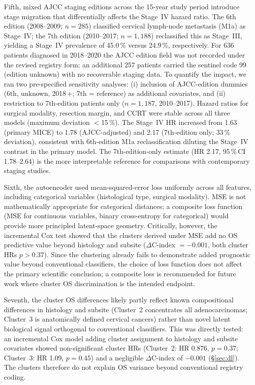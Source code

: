 \documentclass[12pt,a4paper]{article}
\begin{document}
Fifth, mixed AJCC staging editions across the 15-year study period
introduce stage migration that differentially affects the Stage~IV
hazard ratio. The 6th edition (2008--2009; $n = 285$) classified
cervical lymph-node metastasis (M1a) as Stage~IV; the 7th edition
(2010--2017; $n = 1{,}188$) reclassified this as Stage~III, yielding
a Stage~IV prevalence of 45.0\,\% versus 24.9\,\%, respectively.
For 636 patients diagnosed in 2018--2020 the AJCC edition field was
not recorded under the revised registry form; an additional 257 patients
carried the sentinel code 99 (edition unknown) with no recoverable
staging data. To quantify the impact, we ran two pre-specified
sensitivity analyses: (i) inclusion of AJCC-edition dummies
(6th, unknown, 2018\,+; 7th = reference) as additional covariates,
and (ii) restriction to 7th-edition patients only ($n = 1{,}187$,
2010--2017). Hazard ratios for surgical modality, resection margin,
and CCRT were stable across all three models (maximum deviation
$<$15\,\%). The Stage~IV HR increased from 1.63 (primary MICE) to
1.78 (AJCC-adjusted) and 2.17 (7th-edition only; 33\,\% deviation),
consistent with 6th-edition M1a reclassification diluting the Stage~IV
contrast in the primary model. The 7th-edition-only estimate
(HR 2.17, 95\,\%\,CI 1.78--2.64) is the more interpretable reference
for comparisons with contemporary staging studies.

Sixth, the autoencoder used mean-squared-error loss uniformly across all
features, including categorical variables (histological type, surgical
modality). MSE is not mathematically appropriate for categorical distances;
a composite loss function (MSE for continuous variables, binary
cross-entropy for categorical) would provide more principled latent-space
geometry. Critically, however, the incremental Cox test showed that the
clusters derived under MSE add no OS predictive value beyond histology and
subsite ($\Delta$C-index $= -0.001$, both cluster HRs $p > 0.37$). Since
the clustering already fails to demonstrate added prognostic value beyond
conventional classifiers, the choice of loss function does not affect the
primary scientific conclusion; a composite loss is recommended for future
work where cluster OS discrimination is the intended endpoint.

Seventh, the cluster OS differences likely partly reflect known compositional
differences in histology and subsite (Cluster~2 concentrates all
adenocarcinomas; Cluster~3 is anatomically defined cervical cancers) rather
than novel latent biological signal orthogonal to conventional classifiers.
This was directly tested: an incremental Cox model adding cluster assignment
to histology and subsite covariates showed non-significant cluster HRs
(Cluster~2: HR 0.876, $p = 0.37$; Cluster~3: HR 1.09, $p = 0.45$) and a
negligible $\Delta$C-index of $-0.001$ (§\ref{sec:dl}). The clusters
therefore do not explain OS variance beyond conventional registry coding.
\end{document}

